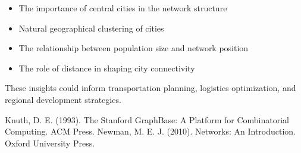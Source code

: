 \documentclass{article}
\begin{document}
\begin{itemize}
    \item The importance of central cities in the network structure
    \item Natural geographical clustering of cities
    \item The relationship between population size and network position
    \item The role of distance in shaping city connectivity
\end{itemize}

These insights could inform transportation planning, logistics optimization, and regional development strategies.


\begin{thebibliography}{9}
 Knuth, D. E. (1993). The Stanford GraphBase: A Platform for Combinatorial Computing. ACM Press.
 Newman, M. E. J. (2010). Networks: An Introduction. Oxford University Press.
\end{thebibliography}
\end{document}
